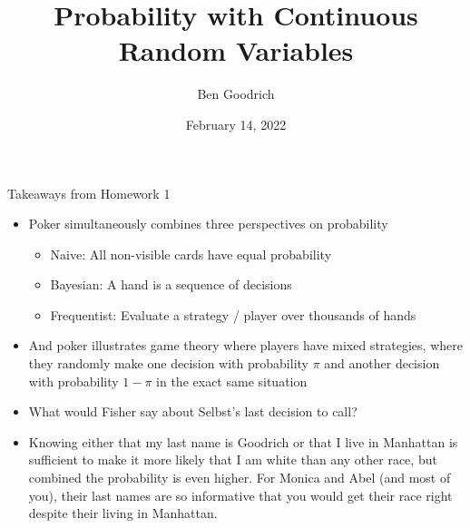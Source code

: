 \documentclass[
  ignorenonframetext,
]{beamer}
\title{Probability with Continuous Random Variables}
\author{Ben Goodrich}
\date{February 14, 2022}
\providecommand{\tightlist}{%
  \setlength{\itemsep}{0pt}\setlength{\parskip}{0pt}}
\begin{document}
\frame{\titlepage}

\begin{frame}
\end{frame}

\begin{frame}{Takeaways from Homework 1}
\protect\hypertarget{takeaways-from-homework-1}{}
\begin{itemize}
\item
  Poker simultaneously combines three perspectives on probability

  \begin{itemize}
  \tightlist
  \item
    Naive: All non-visible cards have equal probability
  \item
    Bayesian: A hand is a sequence of decisions
  \item
    Frequentist: Evaluate a strategy / player over thousands of hands
  \end{itemize}
\item
  And poker illustrates game theory where players have mixed strategies,
  where they randomly make one decision with probability \(\pi\) and
  another decision with probability \(1 - \pi\) in the exact same
  situation
\item
  What would Fisher say about Selbst's last decision to call?
\item
  Knowing either that my last name is Goodrich or that I live in
  Manhattan is sufficient to make it more likely that I am white than
  any other race, but combined the probability is even higher. For
  Monica and Abel (and most of you), their last names are so informative
  that you would get their race right despite their living in Manhattan.
\end{itemize}
\end{frame}
\end{document}
